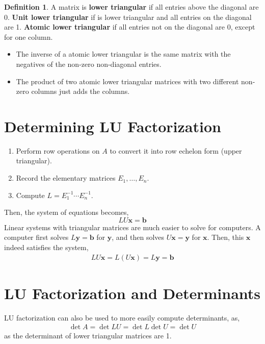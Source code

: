 \documentclass[letterpaper,12pt]{article}
\theoremstyle{definition}
\newtheorem*{definition}{Definition}
\renewcommand{\vec}[1]{\mathbf{#1}}
\begin{document}
\begin{definition}
A matrix is \textbf{lower triangular} if all entries above the diagonal are 0. \textbf{Unit lower triangular} if is lower triangular and all entries on the diagonal are 1. \textbf{Atomic lower triangular} if all entries not on the diagonal are 0, except for one column.
\end{definition}

\begin{itemize}
    \item The inverse of a atomic lower triangular is the same matrix with the negatives of the non-zero non-diagonal entries.
    \item The product of two atomic lower triangular matrices with two different non-zero columns just adds the columns.
\end{itemize}

\section*{Determining LU Factorization}
\begin{enumerate}
    \item Perform row operations on $A$ to convert it into row echelon form (upper triangular).
    \item Record the elementary matrices $E_1, \dots, E_n$.
    \item Compute $L = E_1^{-1} \cdots E_n^{-1}$.
\end{enumerate}

Then, the system of equations becomes,
\begin{equation*}
    LU\vec{x} = \vec{b}
\end{equation*}
Linear systems with triangular matrices are much easier to solve for computers. A computer first solves $L\vec{y} = \vec{b}$ for $\vec{y}$, and then solves $U\vec{x} = \vec{y}$ for $\vec{x}$. Then, this $\vec{x}$ indeed satisfies the system,
\begin{align*}
    LU\vec{x} = L(U\vec{x}) = L\vec{y} = \vec{b}
\end{align*}

\section*{LU Factorization and Determinants}
LU factorization can also be used to more easily compute determinants, as,
\begin{align*}
    \det{A} = \det{LU} = \det{L} \det{U} = \det{U}
\end{align*}
as the determinant of lower triangular matrices are 1.
\end{document}
